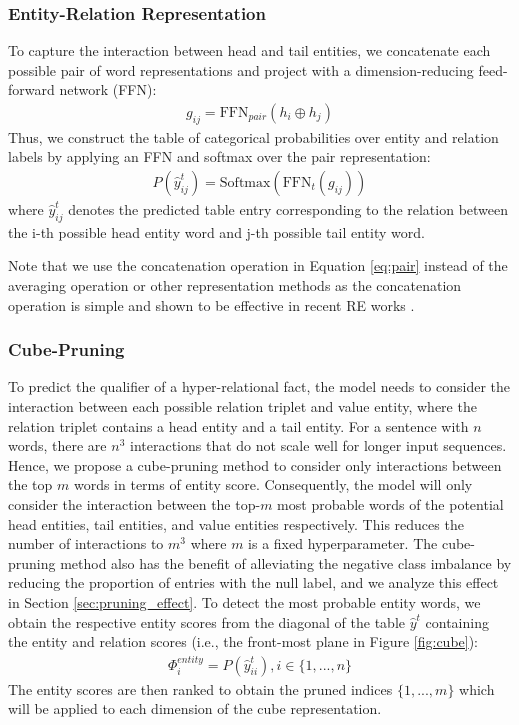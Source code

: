 \documentclass[11pt]{article}
\newcommand{\flag}[1]{#1}
\begin{document}
\subsubsection{Entity-Relation Representation}
To capture the interaction between head and tail entities, we concatenate each possible pair of word representations and project with a dimension-reducing feed-forward network (FFN): 
\begin{align} \label{eq:pair}
    g_{ij} = \text{FFN}_{pair}(h_i \oplus h_j)
\end{align}
Thus, we construct the table of categorical probabilities over entity and relation labels by applying an FFN and softmax over the pair representation:
\begin{align} \label{eq:r_score}
    P(\hat{y}_{ij}^t) = \text{Softmax}(\text{FFN}_{t}(g_{ij}))
\end{align}
where $\hat{y}_{ij}^t$ denotes the predicted table entry corresponding to the relation between the i-th possible head entity word and j-th possible tail entity word.
\flag{
Note that we use the concatenation operation in Equation \ref{eq:pair} instead of the averaging operation or other representation methods \citep{baldini-soares-etal-2019-matching} as the concatenation operation is simple and shown to be effective in recent RE works \citep{wang-etal-2021-unire, wang-lu-2020-two}.
}
\subsubsection{Cube-Pruning}
\label{sec:pruning}
To predict the qualifier of a hyper-relational fact, the model needs to consider the interaction between each possible relation triplet and value entity, where the relation triplet contains a head entity and a tail entity.
For a sentence with $n$ words, there are $n^3$ interactions that do not scale well for longer input sequences. 
Hence, we propose a cube-pruning method to consider only interactions between the top $m$ words in terms of entity score.
Consequently, the model will only consider the interaction between the top-$m$ most probable words of the potential head entities, tail entities, and value entities respectively.
This reduces the number of interactions to $m^3$ where $m$ is a fixed hyperparameter.
The cube-pruning method also has the benefit of alleviating the negative class imbalance by reducing the proportion of entries with the null label, and we analyze this effect in Section \ref{sec:pruning_effect}.
To detect the most probable entity words, we obtain the respective entity scores from the diagonal of the table $\hat{y}^t$ containing the entity and relation scores (i.e., the front-most plane in Figure \ref{fig:cube}):
\begin{align}
    \Phi_i^{entity} = P(\hat{y}_{ii}^{t}), i \in \{1, ..., n\}
\end{align}
The entity scores are then ranked to obtain the pruned indices $\{1, ..., m\}$ which will be applied to each dimension of the cube representation. 
\end{document}
